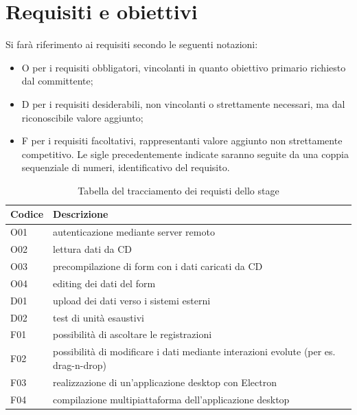 \section{Requisiti e obiettivi}

Si farà riferimento ai requisiti secondo le seguenti notazioni:
\begin{itemize}
  \item O per i requisiti obbligatori, vincolanti in quanto obiettivo primario richiesto dal committente;
  \item D per i requisiti desiderabili, non vincolanti o strettamente necessari, ma dal riconoscibile valore aggiunto;
  \item F per i requisiti facoltativi, rappresentanti valore aggiunto non strettamente competitivo.
        Le sigle precedentemente indicate saranno seguite da una coppia sequenziale di numeri, identificativo del requisito.
\end{itemize}

\renewcommand{\arraystretch}{1.8} %
\begin{table}[H]%
  \begin{tabularx}{\textwidth}{|l|X|}
    \hline
    \textbf{Codice} & \textbf{Descrizione}                                                                \\
    \hline
    O01             & autenticazione mediante server remoto                                               \\
    \hline
    O02             & lettura dati da CD                                                                  \\
    \hline
    O03             & precompilazione di form con i dati caricati da CD                                   \\
    \hline
    O04             & editing dei dati del form                                                           \\
    \hline
    D01             & upload dei dati verso i sistemi esterni                                             \\
    \hline
    D02             & test di unità esaustivi                                                             \\
    \hline
    F01             & possibilità di ascoltare le registrazioni                                           \\
    \hline
    F02             & possibilità di modificare i dati mediante interazioni evolute (per es. drag-n-drop) \\
    \hline
    F03             & realizzazione di un'applicazione desktop con Electron                               \\
    \hline
    F04             & compilazione multipiattaforma dell'applicazione desktop                             \\
    \hline
  \end{tabularx}
  \\
  \label{tab:requisiti-stage}
  \caption{Tabella del tracciamento dei requisti dello stage}
\end{table}%

